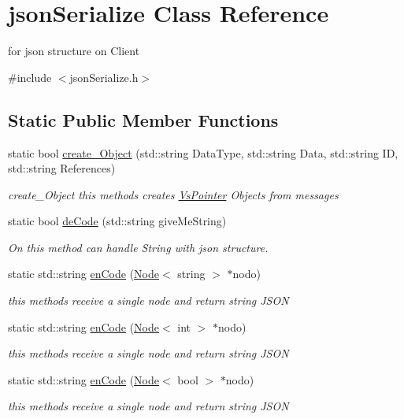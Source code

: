 \hypertarget{classjson_serialize}{}\section{json\+Serialize Class Reference}
\label{classjson_serialize}


for json structure on Client  




{\ttfamily \#include $<$json\+Serialize.\+h$>$}

\subsection*{Static Public Member Functions}
\begin{DoxyCompactItemize}
\item 
static bool \hyperlink{classjson_serialize_aace0573775c4ac71e901ebd1a5cc4dec}{create\+\_\+\+Object} (std\+::string Data\+Type, std\+::string Data, std\+::string ID, std\+::string References)
\begin{DoxyCompactList}\small\item\em create\+\_\+\+Object this methods creates \hyperlink{class_vs_pointer}{Vs\+Pointer} Objects from messages \end{DoxyCompactList}\item 
static bool \hyperlink{classjson_serialize_a7b04db6d9db5ec159de2b1dd5ac6308a}{de\+Code} (std\+::string give\+Me\+String)
\begin{DoxyCompactList}\small\item\em On this method can handle String with json structure. \end{DoxyCompactList}\item 
static std\+::string \hyperlink{classjson_serialize_aca3de79f890e13ca596346ea8db62049}{en\+Code} (\hyperlink{class_node}{Node}$<$ string $>$ $\ast$nodo)
\begin{DoxyCompactList}\small\item\em this methods receive a single node and return string J\+S\+ON \end{DoxyCompactList}\item 
static std\+::string \hyperlink{classjson_serialize_ab8babaccdc4b2930ffbf847d5505634b}{en\+Code} (\hyperlink{class_node}{Node}$<$ int $>$ $\ast$nodo)
\begin{DoxyCompactList}\small\item\em this methods receive a single node and return string J\+S\+ON \end{DoxyCompactList}\item 
static std\+::string \hyperlink{classjson_serialize_ac520a247d3b3f9057c81ec0c518bcfe3}{en\+Code} (\hyperlink{class_node}{Node}$<$ bool $>$ $\ast$nodo)
\begin{DoxyCompactList}\small\item\em this methods receive a single node and return string J\+S\+ON \end{DoxyCompactList}\end{DoxyCompactItemize}


